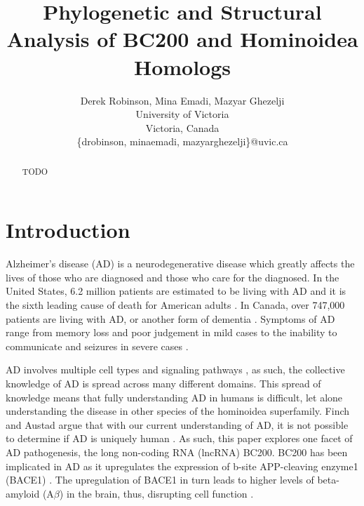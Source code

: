 \documentclass[conference, 11pt]{IEEEtran}
\begin{document}


\title{Phylogenetic and Structural Analysis of BC200 and Hominoidea Homologs}

\author{Derek Robinson, Mina Emadi, Mazyar Ghezelji\\
University of Victoria\\
Victoria, Canada \\
\{drobinson, minaemadi, mazyarghezelji\}@uvic.ca}

\maketitle

\begin{abstract}
  TODO 
\end{abstract}

\section{Introduction}\label{sec:intro}

Alzheimer's disease (AD) is a neurodegenerative disease which greatly affects the lives of those who are diagnosed and those who care for the diagnosed. 
In the United States, 6.2 million patients are estimated to be living with AD and it is the sixth leading cause of death for American adults \cite{AlzheimersDisease}. 
In Canada, over 747,000 patients are living with AD, or another form of dementia \cite{ADcanada}. 
Symptoms of AD range from memory loss and poor judgement in mild cases to the inability to communicate and seizures in severe cases \cite{alzheimersSigns}.

AD involves multiple cell types and signaling pathways \cite{zhang2021role}, as such, the collective knowledge of AD is spread across many different domains. 
This spread of knowledge means that fully understanding AD in humans is difficult, let alone understanding the disease in other species of the hominoidea superfamily.
Finch and Austad argue that with our current understanding of AD, it is not possible to determine if AD is uniquely human \cite{finch2015commentary}. 
As such, this paper explores one facet of AD pathogenesis, the long non-coding RNA (lncRNA) BC200. 
BC200 has been implicated in AD as it upregulates the expression of b-site APP-cleaving enzyme1 (BACE1) \cite{li2018identification,zhang2021role}. 
The upregulation of BACE1 in turn leads to higher levels of beta-amyloid (A$\beta$) in the brain, thus, disrupting cell function \cite{li2018identification,zhang2021role}. 
\end{document}
